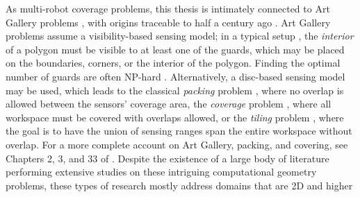 As multi-robot coverage problems, this thesis is intimately connected to Art 
Gallery problems \cite{o1987art,shermer1992recent}, with origins traceable 
to half a century ago \cite{klee1969every}. Art Gallery problems assume 
a visibility-based \cite{lozano1979algorithm} sensing model; in a typical 
setup \cite{o1987art}, the {\em interior} of a polygon must be visible to at 
least one of the guards, which may be placed on the boundaries, corners, 
or the interior of the polygon. Finding the optimal number of guards are 
often NP-hard \cite{lee1986computational}. Alternatively, a disc-based sensing 
model may be used, which leads to the classical {\em packing} problem 
\cite{thue1910dichteste,hales2005proof}, where no overlap is allowed between 
the sensors' coverage area, the {\em coverage} problem 
\cite{drezner1995facility,cortes2004coverage,pavone2009equitable,martinez2010distributed,pierson2017adapting}, 
where all 
workspace must be covered with overlaps allowed, or the {\em tiling} problem 
\cite{kershner1968paving}, where the goal is to have the union of sensing
ranges span the entire workspace without overlap. For a more complete 
account on Art Gallery, packing, and covering, see Chapters 2, 3, and 33 of
\cite{toth2017handbook}. Despite the existence of a large body of literature 
performing extensive studies on these intriguing computational geometry 
problems, these types of research mostly address domains that are 2D and 
higher




